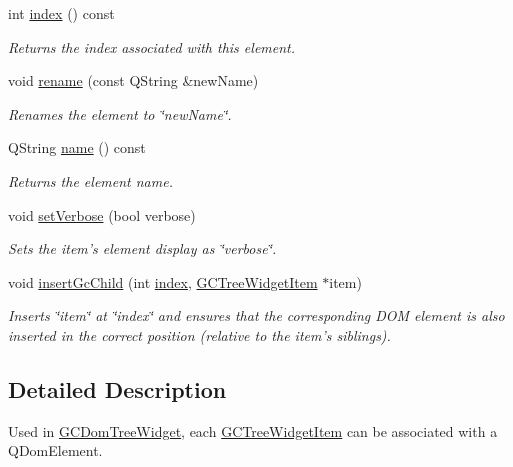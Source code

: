 \begin{DoxyCompactItemize}
int \hyperlink{class_g_c_tree_widget_item_af6b48ae274cc4989811ef44944c8ad76}{index} () const 
\begin{DoxyCompactList}\small\item\em \-Returns the index associated with this element. \end{DoxyCompactList}\item 
void \hyperlink{class_g_c_tree_widget_item_a831acd54bf1060e3ec45a8e46439385a}{rename} (const \-Q\-String \&new\-Name)
\begin{DoxyCompactList}\small\item\em \-Renames the element to \char`\"{}new\-Name\char`\"{}. \end{DoxyCompactList}\item 
\-Q\-String \hyperlink{class_g_c_tree_widget_item_a3af8c66a690cd55986a38b996a375ba4}{name} () const 
\begin{DoxyCompactList}\small\item\em \-Returns the element name. \end{DoxyCompactList}\item 
void \hyperlink{class_g_c_tree_widget_item_a557b0034fd98a444a7173d76a6320f4c}{set\-Verbose} (bool verbose)
\begin{DoxyCompactList}\small\item\em \-Sets the item's element display as \char`\"{}verbose\char`\"{}. \end{DoxyCompactList}\item 
void \hyperlink{class_g_c_tree_widget_item_a197806cd712ae04b129acd1699674df5}{insert\-Gc\-Child} (int \hyperlink{class_g_c_tree_widget_item_af6b48ae274cc4989811ef44944c8ad76}{index}, \hyperlink{class_g_c_tree_widget_item}{\-G\-C\-Tree\-Widget\-Item} $\ast$item)
\begin{DoxyCompactList}\small\item\em \-Inserts \char`\"{}item\char`\"{} at \char`\"{}index\char`\"{} and ensures that the corresponding \-D\-O\-M element is also inserted in the correct position (relative to the item's siblings). \end{DoxyCompactList}\end{DoxyCompactItemize}


\subsection{\-Detailed \-Description}
\-Used in \hyperlink{class_g_c_dom_tree_widget}{\-G\-C\-Dom\-Tree\-Widget}, each \hyperlink{class_g_c_tree_widget_item}{\-G\-C\-Tree\-Widget\-Item} can be associated with a \-Q\-Dom\-Element. 

